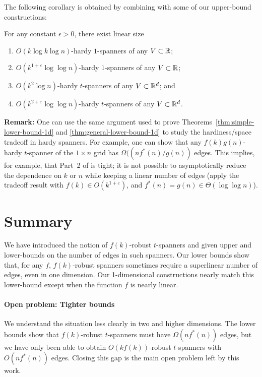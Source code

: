 \documentclass{sig-alternate}
\newcommand{\eps}{\varepsilon}
\begin{document}
The following corollary is obtained by combining 
with some of our upper-bound constructions:
\begin{cor}
  For any constant $\epsilon >0$, there exist linear size
  \begin{enumerate}
    \item $O(k\log k\log n)$-hardy $1$-spanners of any
      $V\subset \mathbb{R}$;
    \item $O(k^{1+\eps}\log\log n)$-hardy $1$-spanners of any
      $V\subset \mathbb{R}$;
    \item $O(k^2\log n)$-hardy $t$-spanners of any
      $V\subset \mathbb{R}^d$; and
    \item $O(k^{2+\eps}\log\log n)$-hardy $t$-spanners of any
      $V\subset \mathbb{R}^d$.
  \end{enumerate}
\end{cor}


\noindent\textbf{Remark:}
One can use the same argument used to prove
Theorems~\ref{thm:simple-lower-bound-1d} and
\ref{thm:general-lower-bound-1d} to study the hardiness/space tradeoff
in hardy spanners.  For example, one can show that any $f(k)g(n)$-hardy
$t$-spanner of the $1\times n$ grid has $\Omega((nf^*(n)/g(n))$ edges.
This implies, for example, that Part~2 of  is tight;
it is not possible to asymptotically reduce the dependence on $k$ or $n$
while keeping a linear number of edges (apply the tradeoff result with
$f(k)\in O(k^{1+\eps})$, and $f^*(n)=g(n)\in \Theta(\log\log n)$).

\section{Summary}

We have introduced the notion of $f(k)$-robust $t$-spanners and given
upper and lower-bounds on the number of edges in such spanners.  Our lower
bounds show that, for any $f$, $f(k)$-robust spanners sometimes require
a superlinear number of edges, even in one dimension.  Our 1-dimensional
constructions nearly match this lower-bound except when the function
$f$ is nearly linear.

\paragraph{Open problem: Tighter bounds}
We understand the situation less clearly in two and higher dimensions.
The lower bounds show that $f(k)$-robust $t$-spanners must have
$\Omega(nf^*(n))$ edges, but we have only been able to obtain
$O(kf(k))$-robust $t$-spanners with $O(nf^*(n))$ edges.  Closing this
gap is the main open problem left by this work.
\end{document}
